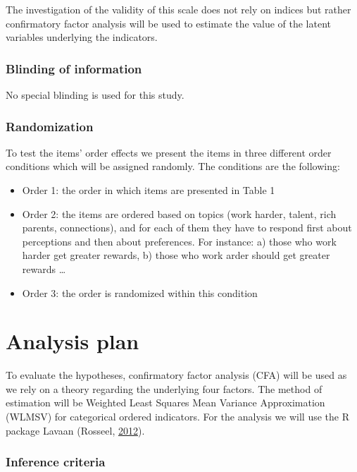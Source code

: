 \documentclass[
]{article}
\providecommand{\tightlist}{%
  \setlength{\itemsep}{0pt}\setlength{\parskip}{0pt}}
\begin{document}
The investigation of the validity of this scale does not rely on indices
but rather confirmatory factor analysis will be used to estimate the
value of the latent variables underlying the indicators.

\hypertarget{blinding-of-information}{%
\subsubsection{Blinding of information}\label{blinding-of-information}}

No special blinding is used for this study.

\hypertarget{randomization}{%
\subsubsection{Randomization}\label{randomization}}

To test the items' order effects we present the items in three different
order conditions which will be assigned randomly. The conditions are the
following:

\begin{itemize}
\tightlist
\item
  Order 1: the order in which items are presented in Table 1
\item
  Order 2: the items are ordered based on topics (work harder, talent,
  rich parents, connections), and for each of them they have to respond
  first about perceptions and then about preferences. For instance: a)
  those who work harder get greater rewards, b) those who work arder
  should get greater rewards \ldots{}
\item
  Order 3: the order is randomized within this condition
\end{itemize}

\hypertarget{analysis-plan}{%
\section{Analysis plan}\label{analysis-plan}}

To evaluate the hypotheses, confirmatory factor analysis (CFA) will be
used as we rely on a theory regarding the underlying four factors. The
method of estimation will be Weighted Least Squares Mean Variance
Approximation (WLMSV) for categorical ordered indicators. For the
analysis we will use the R package Lavaan (Rosseel,
\protect\hyperlink{ref-Rosseel2012}{2012}).

\hypertarget{inference-criteria}{%
\subsubsection{Inference criteria}\label{inference-criteria}}
\end{document}
